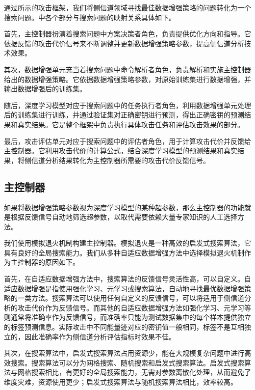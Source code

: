 {{	通过所示的攻击框架，我们将侧信道领域寻找最佳数据增强策略的问题转化为一个搜索问题。中各个部分与搜索问题的映射关系具体如下。
	
	首先，主控制器扮演着搜索问题中方案决策者角色，负责提供优化方向和指导。它依据反馈的攻击代价信号来不断调整并更新数据增强策略参数，提高侧信道分析技术效果。
	
	其次，数据增强单元充当着搜索问题中命令解析者角色，负责解析和实施主控制器给出的数据增强策略。它依据数据增强策略参数，对原始训练集进行数据增强，并输出数据增强后的训练集。
	
	随后，深度学习模型对应于搜索问题中的任务执行者角色，利用数据增强单元处理后的训练集进行训练，并通过验证集对正确密钥进行预测，得出正确密钥的预测结果和真实结果。它是整个框架中负责执行具体攻击任务和评估攻击效果的部分。
	
	最后，攻击评估单元对应于搜索问题中的评估者角色，用于计算攻击代价并反馈给主控制器。它利用攻击代价的计算公式，结合深度学习模型的预测结果和真实结果，将侧信道分析结果转化为主控制器所需要的攻击代价反馈信号。
	}
	\subsection{主控制器}\label{subs:conceptcontroller}
	如果将数据增强策略参数视为深度学习模型的某种超参数，那么主控制器的功能就是根据反馈信号自动地筛选超参数，以取代需要依赖大量专家知识的人工选择方法。
	
	{\color{\dupc}
		
		我们使用模拟退火机制构建主控制器。模拟退火是一种高效的启发式搜索算法，它具有良好的全局搜索能力。我们从多种自适应数据增强方法中选择模拟退火机制作为主控制器的原因如下。 
		
		首先，在自适应数据增强方法中，搜索算法的反馈信号灵活性高，可以自定义。自适应数据增强是指使用强化学习、元学习或搜索算法，自动地寻找最优数据增强策略的一类方法。搜索算法可以使用任何自定义的反馈信号，可以将适用于侧信道分析的攻击代价作为反馈信号。而其他的自适应数据增强方法如强化学习、元学习等则通常将准确率作为反馈信号，而准确率只能为测试数据集中的每个样本提供独立的标签预测信息。实际攻击中不同能量迹对应的密钥值一般相同，标签不是互相独立的，因此准确率作为侧信道分析评估指标时效果不佳\citep{Picek19}。
		
		其次，在搜索算法中，启发式搜索算法占用资源少，能在大规模复杂问题中进行高效搜索。搜索算法可以分为网格搜索、随机搜索和启发式搜索算法。启发式搜索算法与网格搜索相比，有更好的全局搜索能力，无需对参数离散化处理，从而避免了维度灾难，资源使用更少；启发式搜索算法与随机搜索算法相比，效率较高。
		
}}
